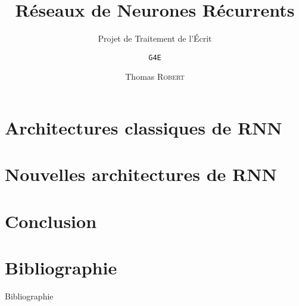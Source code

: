 \documentclass[compress,xcolor=table]{beamer}
\title{\LARGE Réseaux de Neurones Récurrents\newline{\Large \em Recurrent Neural Networks (RNN)\newline~}}
\subtitle{\large Projet de Traitement de l'Écrit}
\date{\formatdate{20}{2}{2015}}
\author{\texttt{G4E} \and Thomas \textsc{Robert}}
\institute{Université de Rouen}
\begin{document}


\section{Architectures classiques de RNN}


\section{Nouvelles architectures de RNN}


\section{Conclusion}


\section{Bibliographie}
\begin{frame}[allowframebreaks]{Bibliographie}
%
%
\printbibliography
 \end{frame}
\end{document}
